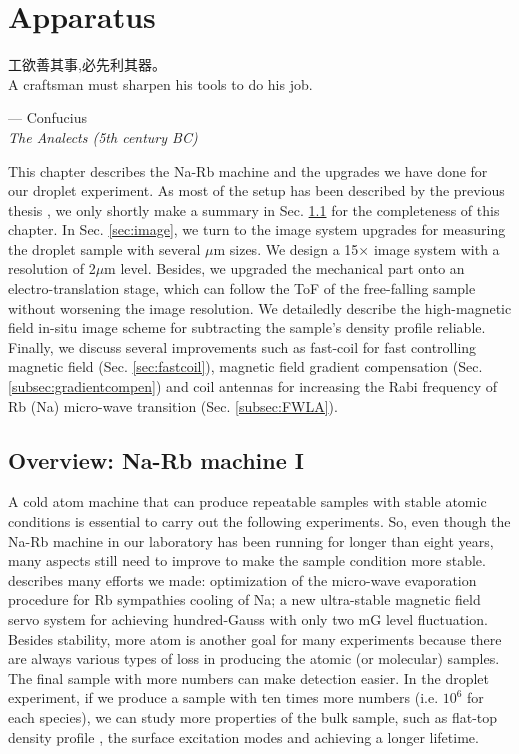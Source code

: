 \chapter{Apparatus}
\label{Chap_Apparatus}

\setlength{\unitlength}{1pt}
\setlength{\epigraphwidth}{10.5cm}
\epigraph{工欲善其事,必先利其器。\\ A craftsman must sharpen his tools to do his job. \cite{Confucius1993Ta}}{--- Confucius\\ \textit{The Analects (5th century BC)}}

This chapter describes the Na-Rb machine and the upgrades we have done for our droplet experiment. As most of the setup has been described by the previous thesis \cite{WangFudong2016Soau,LiXiaoke2015Chsd}, we only shortly make a summary in Sec. \ref{sec:machine} for the completeness of this chapter. In Sec. \ref{sec:image}, we turn to the image system upgrades for measuring the droplet sample with several $\mu$m sizes. We design a 15$\times$ image system with a resolution of 2$\mu$m level. Besides, we upgraded the mechanical part onto an electro-translation stage, which can follow the ToF of the free-falling sample without worsening the image resolution. We detailedly describe the high-magnetic field in-situ image scheme for subtracting the sample's density profile reliable. Finally, we discuss several improvements such as fast-coil for fast controlling magnetic field (Sec. \ref{sec:fastcoil}), magnetic field gradient compensation (Sec. \ref{subsec:gradientcompen}) and coil antennas for increasing the Rabi frequency of Rb (Na) micro-wave transition (Sec. \ref{subsec:FWLA}).

\section{Overview: Na-Rb machine I}
\label{sec:machine}

A cold atom machine that can produce repeatable samples with stable atomic conditions is essential to carry out the following experiments. So, even though the Na-Rb machine in our laboratory has been running for longer than eight years, many aspects still need to improve to make the sample condition more stable. \cite{LiLintao2021} describes many efforts we made: optimization of the micro-wave evaporation procedure for Rb sympathies cooling of Na; a new ultra-stable magnetic field servo system for achieving hundred-Gauss with only two mG level fluctuation. Besides stability, more atom is another goal for many experiments because there are always various types of loss in producing the atomic (or molecular) samples. The final sample with more numbers can make detection easier. In the droplet experiment, if we produce a sample with ten times more numbers (i.e. $10^6$ for each species), we can study more properties of the bulk sample, such as flat-top density profile \cite{petrov2015}, the surface excitation modes \cite{petrov2015} and achieving a longer lifetime.

